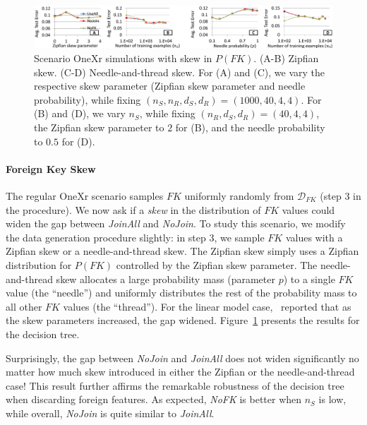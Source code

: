 \documentclass[sigconf]{acmart}
\begin{document}
\begin{figure}[t]
\centering
\includegraphics[width=2\columnwidth,height=\textheight,keepaspectratio]{skewfk_onexr.pdf}
\vspace{-2mm}
\caption{Scenario OneXr simulations with skew in $P(FK)$. (A-B) Zipfian skew. (C-D) Needle-and-thread skew. For (A) and (C), we vary the respective skew parameter
(Zipfian skew parameter and needle probability), while fixing $(n_S, n_R, d_S, d_R) = (1000, 40, 4, 4)$. For (B) and (D), we vary $n_S$, while fixing $(n_R, d_S, d_R) = (40, 4, 4)$,
the Zipfian skew parameter to $2$ for (B), and the needle probability to $0.5$ for (D).
}
\vspace{-2mm}
\label{Figure:OneXrZipfSimulation}
\end{figure}

\vspace{-1mm}
\paragraph*{\textbf{Foreign Key Skew}}
The regular OneXr scenario samples $FK$ uniformly randomly from $\mathcal{D}_{FK}$ (step 3 in the procedure). We now ask if a \textit{skew} in 
the distribution of $FK$ values could widen the gap between \textit{JoinAll} and \textit{NoJoin}. To study this scenario, we modify the data generation procedure slightly:
in step 3, we sample $FK$ values with a Zipfian skew or a needle-and-thread skew. The Zipfian skew simply uses a Zipfian distribution for $P(FK)$ controlled by the Zipfian
skew parameter. The needle-and-thread skew allocates a large probability mass (parameter $p$) to a single $FK$ value (the ``needle'') and uniformly distributes the rest of 
the probability mass to all other $FK$ values (the ``thread''). For the linear model case,~\cite{hamlet} reported that as the skew parameters increased, the gap widened.
Figure~\ref{Figure:OneXrZipfSimulation} presents the results for the decision tree.

Surprisingly, the gap between \textit{NoJoin} and \textit{JoinAll} does not widen significantly no matter how much skew introduced in either the Zipfian or the 
needle-and-thread case! This result further affirms the remarkable robustness of the decision tree when discarding foreign features. As expected, 
\textit{NoFK} is better when $n_S$ is low, while overall, \textit{NoJoin} is quite similar to \textit{JoinAll}.
\end{document}
